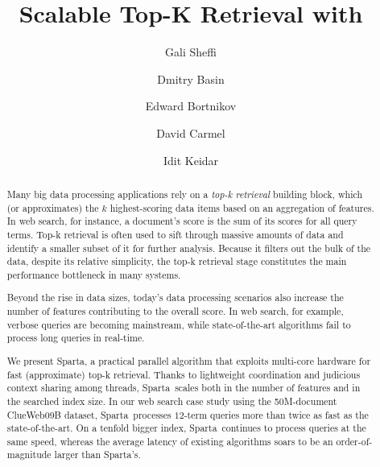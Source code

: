 \documentclass[sigplan,10pt,review,anonymous]{acmart}
\title{Scalable Top-K Retrieval with \alg}
\author{Gali Sheffi}%
\author{Dmitry Basin}%
\author{Edward Bortnikov}%
\author{David Carmel}%
\author{Idit Keidar}%
\newcommand{\alg}{Sparta}
\begin{document}
\begin{abstract}


Many big data processing applications rely on a \emph{top-k retrieval} building block, which  (or approximates) the $k$ highest-scoring data items based on an aggregation of features. 
In web search, for instance, a document's score is the sum of its scores for all query terms. Top-k retrieval is often used to sift through massive amounts of data and identify a smaller subset of it for further  analysis. Because it filters out the bulk of the data, despite its relative simplicity, the top-k retrieval stage constitutes the main performance bottleneck
in many systems.  

Beyond the rise in data sizes, today's data processing scenarios also increase the number of features contributing to the overall score. 
In web search, for example, 
verbose queries are becoming mainstream,  
while state-of-the-art algorithms fail to process long queries in real-time. 


We present \alg, a practical parallel algorithm that exploits multi-core hardware for fast (approximate) top-k retrieval. 
Thanks to lightweight coordination and judicious context sharing among threads,
\alg\ scales both in the number of features and in the searched index size. 
In our web search case study using 
the 50M-document  ClueWeb09B 
dataset, \alg\  processes $12$-term queries more than twice as fast as the state-of-the-art. 
On a tenfold  bigger index, 
\alg\ continues to process queries at the same speed, whereas the average latency of 
existing algorithms soars to be an order-of-magnitude larger than \alg's.


\end{abstract}


\maketitle








\clearpage

  
\end{document}

